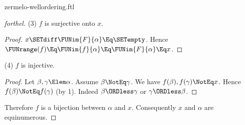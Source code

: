 \documentclass{stex}
\begin{document}
\begin{smodule}{zermelo-wellordering.ftl}
\begin{proof}[forthel]
  (3) $f$ is surjective onto $x$.
  \begin{proof}
    $x \SETdiff \FUNim{F}{\alpha} \Eq \SETempty$.
    Hence $\FUNrange(f)
      \Eq \FUNim{f}{\alpha}
      \Eq \FUNim{F}{\alpha}
      \Eq x$.
  \end{proof}

  (4) $f$ is injective.
  \begin{proof}
    Let $\beta, \gamma \Elem \alpha$.
    Assume $\beta \NotEq \gamma$.
    We have $f(\beta), f(\gamma) \NotEq x$.
    Hence $f(\beta) \NotEq f(\gamma)$ (by 1).
    Indeed $\beta \ORDless \gamma$ or $\gamma \ORDless \beta$.
  \end{proof}

  Therefore $f$ is a bijection between $\alpha$ and $x$.
  Consequently $x$ and $\alpha$ are equinumerous.
\end{proof}

\printbibliography
{}
\end{smodule}
\end{document}
